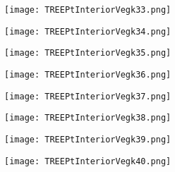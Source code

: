 \documentclass[pdf]{beamer}
\begin{document}
\begin{frame}
\begin{figure}[!h]
\centering
\texttt{[image: TREEPtInteriorVegk33.png]}
\end{figure}
\end{frame}

\begin{frame}
\begin{figure}[!h]
\centering
\texttt{[image: TREEPtInteriorVegk34.png]}
\end{figure}
\end{frame}

\begin{frame}
\begin{figure}[!h]
\centering
\texttt{[image: TREEPtInteriorVegk35.png]}
\end{figure}
\end{frame}

\begin{frame}
\begin{figure}[!h]
\centering
\texttt{[image: TREEPtInteriorVegk36.png]}
\end{figure}
\end{frame}

\begin{frame}
\begin{figure}[!h]
\centering
\texttt{[image: TREEPtInteriorVegk37.png]}
\end{figure}
\end{frame}

\begin{frame}
\begin{figure}[!h]
\centering
\texttt{[image: TREEPtInteriorVegk38.png]}
\end{figure}
\end{frame}

\begin{frame}
\begin{figure}[!h]
\centering
\texttt{[image: TREEPtInteriorVegk39.png]}
\end{figure}
\end{frame}

\begin{frame}
\begin{figure}[!h]
\centering
\texttt{[image: TREEPtInteriorVegk40.png]}
\end{figure}
\end{frame}
\end{document}
